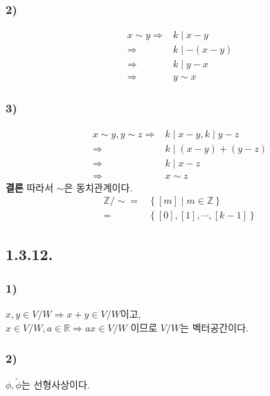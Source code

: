 \documentclass{article}
\begin{document}
\subsubsection{2)}
\begin{align*}
x \sim y \Rightarrow& k \mid x - y
\\ \Rightarrow& k \mid -(x - y)
\\ \Rightarrow& k \mid y - x
\\ \Rightarrow& y \sim x
\end{align*}

\subsubsection{3)}
\begin{align*}
x \sim y, y \sim z \Rightarrow& k \mid x - y, k \mid y - z
\\ \Rightarrow& k \mid (x - y) + (y - z)
\\ \Rightarrow& k \mid x - z
\\ \Rightarrow& x \sim z
\end{align*}
\textbf{결론} 따라서 $\sim$은 동치관계이다.
\begin{align*}
\mathbb{Z} / \sim =& \left\{\left[m \right] \mid m \in \mathbb{Z} \right\}
\\ =& \left\{\left[0 \right], \left[1 \right], \cdots, \left[k-1 \right] \right\}
\end{align*}

\subsection{1.3.12.}
\subsubsection{1)}
$x, y \in V/W \Rightarrow x + y \in V/W$이고, 
\\$x \in V/W, a \in \mathbb{R} \Rightarrow ax \in V/W$ 이므로
$V/W$는 벡터공간이다.

\subsubsection{2)}
$\phi, \widetilde{\phi}$는 선형사상이다.
\end{document}
